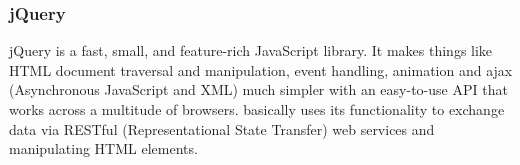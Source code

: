 \subsubsection{jQuery}
jQuery is a fast, small, and feature-rich JavaScript library. It makes things like HTML document traversal and manipulation, event handling, animation and ajax (Asynchronous JavaScript and XML) much simpler with an easy-to-use API that works across a multitude of browsers. \toolname{} basically uses its functionality to exchange data via RESTful (Representational State Transfer) web services and manipulating HTML elements.